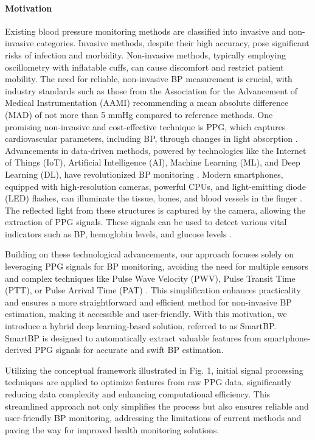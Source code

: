 \documentclass[journal,twoside,web]{ieeecolor}
\begin{document}
\paragraph*{\textbf{Motivation}}
Existing blood pressure monitoring methods are classified into invasive and non-invasive categories. Invasive methods, despite their high accuracy, pose significant risks of infection and morbidity. Non-invasive methods, typically employing oscillometry with inflatable cuffs, can cause discomfort and restrict patient mobility. The need for reliable, non-invasive BP measurement is crucial, with industry standards such as those from the Association for the Advancement of Medical Instrumentation (AAMI) recommending a mean absolute difference (MAD) of not more than 5 mmHg compared to reference methods. One promising non-invasive and cost-effective technique is PPG, which captures cardiovascular parameters, including BP, through changes in light absorption \cite{b5}. Advancements in data-driven methods, powered by technologies like the Internet of Things (IoT), Artificial Intelligence (AI), Machine Learning (ML), and Deep Learning (DL), have revolutionized BP monitoring \cite{b8}. Modern smartphones, equipped with high-resolution cameras, powerful CPUs, and light-emitting diode (LED) flashes, can illuminate the tissue, bones, and blood vessels in the finger \cite{b11}. The reflected light from these structures is captured by the camera, allowing the extraction of PPG signals. These signals can be used to detect various vital indicators such as BP, hemoglobin levels, and glucose levels \cite{b20}\cite{b26}.

Building on these technological advancements, our approach focuses solely on leveraging PPG signals for BP monitoring, avoiding the need for multiple sensors and complex techniques like Pulse Wave Velocity (PWV), Pulse Transit Time (PTT), or Pulse Arrival Time (PAT) \cite{b9} \cite{b27}. This simplification enhances practicality and ensures a more straightforward and efficient method for non-invasive BP estimation, making it accessible and user-friendly. With this motivation, we introduce a hybrid deep learning-based solution, referred to as SmartBP. SmartBP is designed to automatically extract valuable features from smartphone-derived PPG signals for accurate and swift BP estimation.

Utilizing the conceptual framework illustrated in Fig. 1, initial signal processing techniques are applied to optimize features from raw PPG data, significantly reducing data complexity and enhancing computational efficiency. This streamlined approach not only simplifies the process but also ensures reliable and user-friendly BP monitoring, addressing the limitations of current methods and paving the way for improved health monitoring solutions.
\end{document}
